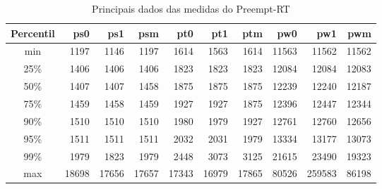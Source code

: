 \begin{table}[h!]
\centering
\begin{center}
\begin{tabular}{|c|r|r|r|r|r|r|r|r|r|}
\toprule
Percentil &    ps0 &    ps1 &    psm &    pt0 &    pt1 &    ptm &    pw0 &     pw1 &    pwm \\
\midrule
    min &   1197 &   1146 &   1197 &   1614 &   1563 &   1614 &  11563 &   11562 &  11562 \\
    25\% &   1406 &   1406 &   1406 &   1823 &   1823 &   1823 &  12084 &   12084 &  12083 \\
    50\% &   1407 &   1407 &   1458 &   1875 &   1875 &   1875 &  12239 &   12240 &  12187 \\
    75\% &   1459 &   1458 &   1459 &   1927 &   1927 &   1875 &  12396 &   12447 &  12344 \\
    90\% &   1510 &   1510 &   1510 &   1980 &   1979 &   1927 &  12761 &   12760 &  12656 \\
    95\% &   1511 &   1511 &   1511 &   2032 &   2031 &   1979 &  13334 &   13177 &  13073 \\
    99\% &   1979 &   1823 &   1979 &   2448 &   3073 &   3125 &  21615 &   23490 &  19323 \\
    max &  18698 &  17656 &  17657 &  17343 &  16979 &  17865 &  80526 &  259583 &  86198 \\
\bottomrule
\end{tabular}
\end{center}
\caption{Principais dados das medidas do Preempt-RT}
\label{table:prt}
\end{table}





